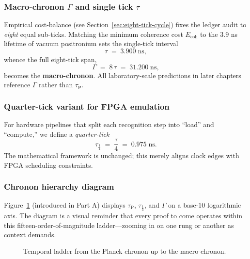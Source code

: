 \documentclass[11pt,oneside]{book}
\begin{document}
\subsubsection{Macro-chronon \texorpdfstring{$\Gamma$}{Gamma} and single tick \texorpdfstring{$\tau$}{tau}}
\label{subsubsec:macro-chronon}

Empirical cost-balance (see Section~\ref{sec:eight-tick-cycle}) fixes the
ledger audit to \emph{eight} equal sub-ticks.  Matching the minimum
coherence cost $E_{\text{coh}}$ to the $3.9$ ns lifetime of vacuum
positronium sets the single-tick interval
\[
  \tau \;=\; 3.900\;\text{ns},
\]
whence the full eight-tick span,
\[
  \Gamma \;=\; 8\,\tau
          \;=\; 31.200\;\text{ns},
\]
becomes the \textbf{macro-chronon}.  All laboratory-scale predictions in later
chapters reference $\Gamma$ rather than $\tau_{\text{P}}$.

\subsubsection{Quarter-tick variant for FPGA emulation}
\label{subsubsec:quarter-tick}

For hardware pipelines that split each recognition step into “load” and
“compute,” we define a \emph{quarter-tick}
\[
  \tau_{\tfrac14} \;=\; \frac{\tau}{4}
               \;=\; 0.975\;\text{ns}.
\]
The mathematical framework is unchanged; this merely aligns clock edges with
FPGA scheduling constraints.

\subsubsection{Chronon hierarchy diagram}
\label{subsubsec:chronon-timeline}

Figure~\ref{fig:chronon-hierarchy} (introduced in
Part A) displays $\tau_{\text{P}}$, $\tau_{\tfrac14}$, and $\Gamma$ on a
base-10 logarithmic axis.  The diagram is a visual reminder that every proof
to come operates within this fifteen-order-of-magnitude ladder—zooming in on
one rung or another as context demands.

\begin{figure}[ht]
  \centering
  \caption{Temporal ladder from the Planck chronon up to the macro-chronon.}
  \label{fig:chronon-hierarchy}
\end{figure}
\end{document}
